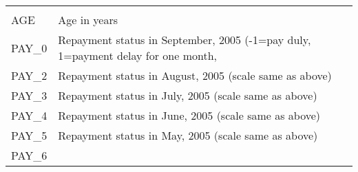 \documentclass[]{article}
\begin{document}
\begin{longtable}[]{@{}ll@{}}
\begin{minipage}[t]{0.70\columnwidth}
\end{minipage}\tabularnewline
\begin{minipage}[t]{0.24\columnwidth}\raggedright\strut
AGE\strut
\end{minipage} & \begin{minipage}[t]{0.70\columnwidth}\raggedright\strut
Age in years\strut
\end{minipage}\tabularnewline
\begin{minipage}[t]{0.24\columnwidth}\raggedright\strut
PAY\_0\strut
\end{minipage} & \begin{minipage}[t]{0.70\columnwidth}\raggedright\strut
Repayment status in September, 2005 (-1=pay duly, 1=payment delay for
one month,\strut
\end{minipage}\tabularnewline
\begin{minipage}[t]{0.24\columnwidth}\raggedright\strut
PAY\_2\strut
\end{minipage} & \begin{minipage}[t]{0.70\columnwidth}\raggedright\strut
Repayment status in August, 2005 (scale same as above)\strut
\end{minipage}\tabularnewline
\begin{minipage}[t]{0.24\columnwidth}\raggedright\strut
PAY\_3\strut
\end{minipage} & \begin{minipage}[t]{0.70\columnwidth}\raggedright\strut
Repayment status in July, 2005 (scale same as above)\strut
\end{minipage}\tabularnewline
\begin{minipage}[t]{0.24\columnwidth}\raggedright\strut
PAY\_4\strut
\end{minipage} & \begin{minipage}[t]{0.70\columnwidth}\raggedright\strut
Repayment status in June, 2005 (scale same as above)\strut
\end{minipage}\tabularnewline
\begin{minipage}[t]{0.24\columnwidth}\raggedright\strut
PAY\_5\strut
\end{minipage} & \begin{minipage}[t]{0.70\columnwidth}\raggedright\strut
Repayment status in May, 2005 (scale same as above)\strut
\end{minipage}\tabularnewline
\begin{minipage}[t]{0.24\columnwidth}\raggedright\strut
PAY\_6\strut
\end{minipage} & \begin{minipage}[t]{0.70\columnwidth}\raggedright\strut

\end{minipage}
\end{longtable}
\end{document}

